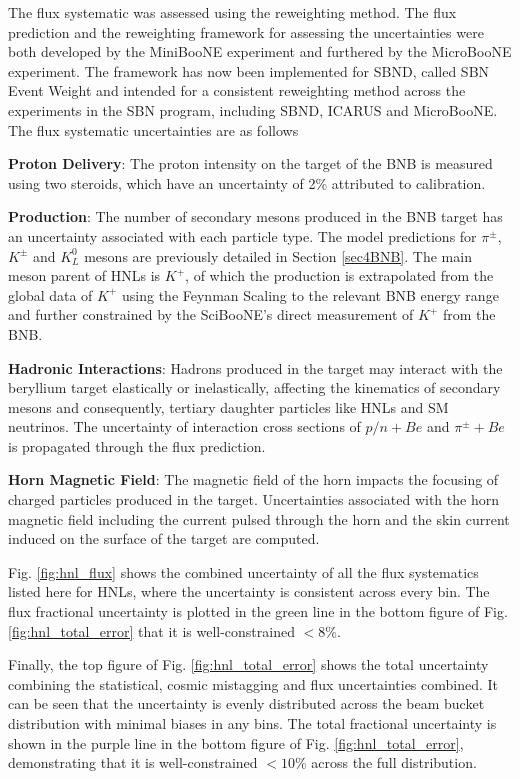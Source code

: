 The flux systematic was assessed using the reweighting method.
The flux prediction and the reweighting framework for assessing the uncertainties were both developed by the MiniBooNE experiment and furthered by the MicroBooNE experiment.
The framework has now been implemented for SBND, called SBN Event Weight \cite{sbnweight_module} and intended for a consistent reweighting method across the experiments in the SBN program, including SBND, ICARUS and MicroBooNE.
The flux systematic uncertainties are as follows
\begin{coloritemize}
	\item \textbf{Proton Delivery}: The proton intensity on the target of the BNB is measured using two steroids, which have an uncertainty of 2\% attributed to calibration.
	\item \textbf{Production}: The number of secondary mesons produced in the BNB target has an uncertainty associated with each particle type. 
		The model predictions for $\pi^\pm$, $K^\pm$ and $K^0_L$ mesons are previously detailed in Section \ref{sec4BNB}.
		The main meson parent of HNLs is $K^+$, of which the production is extrapolated from the global data of $K^+$ using the Feynman Scaling to the relevant BNB energy range and further constrained by the SciBooNE's direct measurement of $K^+$ from the BNB.
	\item \textbf{Hadronic Interactions}: Hadrons produced in the target may interact with the beryllium target elastically or inelastically, affecting the kinematics of secondary mesons and consequently, tertiary daughter particles like HNLs and SM neutrinos.
		The uncertainty of interaction cross sections of $p/n + Be$ and $\pi^\pm + Be$ is propagated through the flux prediction.
	\item \textbf{Horn Magnetic Field}: The magnetic field of the horn impacts the focusing of charged particles produced in the target.
		Uncertainties associated with the horn magnetic field including the current pulsed through the horn and the skin current induced on the surface of the target are computed.
\end{coloritemize}
Fig. \ref{fig:hnl_flux} shows the combined uncertainty of all the flux systematics listed here for HNLs, where the uncertainty is consistent across every bin.
The flux fractional uncertainty is plotted in the green line in the bottom figure of Fig. \ref{fig:hnl_total_error} that it is well-constrained $< 8\%$.

Finally, the top figure of Fig. \ref{fig:hnl_total_error} shows the total uncertainty combining the statistical, cosmic mistagging and flux uncertainties combined.
It can be seen that the uncertainty is evenly distributed across the beam bucket distribution with minimal biases in any bins. 
The total fractional uncertainty is shown in the purple line in the bottom figure of Fig. \ref{fig:hnl_total_error}, demonstrating that it is well-constrained $< 10\%$ across the full distribution.

